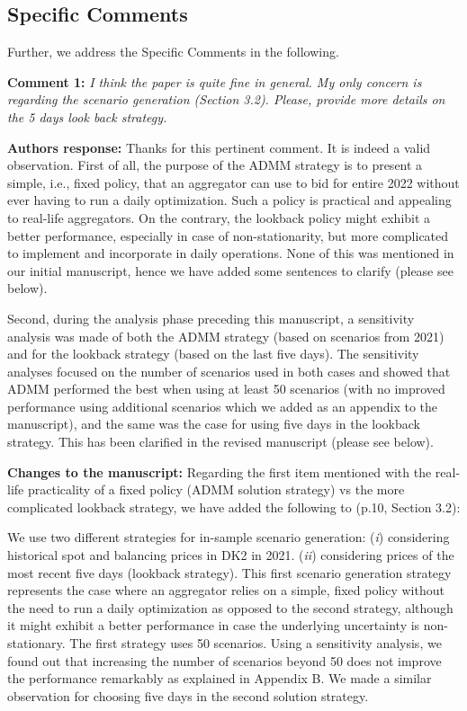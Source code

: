 \documentclass[10pt]{article}
\newcommand{\nt}[1]{\textcolor{newtextcolor}{#1}}
\newcommand{\auth}{\textbf{Authors response: }}
\newcommand{\changes}{\textbf{Changes to the manuscript: }}
\begin{document}
\subsection{Specific Comments}

Further, we address the Specific Comments in the following.

\textbf{Comment 1:} \textit{I think the paper is quite fine in general. My only concern is regarding the scenario generation (Section 3.2). Please, provide more details on the 5 days look back strategy.}

\auth Thanks for this pertinent comment. It is indeed a valid observation. First of all, the purpose of the ADMM strategy is to present a simple, i.e., fixed policy, that an aggregator can use to bid for entire 2022 without ever having to run a daily optimization. Such a policy is practical and appealing to real-life aggregators. On the contrary, the lookback policy might exhibit a better performance, especially in case of non-stationarity, but more complicated to implement and incorporate in daily operations. None of this was mentioned in our initial manuscript, hence we have added some sentences to clarify (please see below).

Second, during the analysis phase preceding this manuscript, a sensitivity analysis was made of both the ADMM strategy (based on scenarios from 2021) and for the lookback strategy (based on the last five days). The sensitivity analyses focused on the number of scenarios used in both cases and showed that ADMM performed the best when using at least 50 scenarios (with no improved performance using additional scenarios which we added as an appendix to the manuscript), and the same was the case for using five days in the lookback strategy. This has been clarified in the revised manuscript (please see below).

\changes Regarding the first item mentioned with the real-life practicality of a fixed policy (ADMM solution strategy) vs the more complicated lookback strategy, we have added the following to (p.10, Section 3.2):

\nt{We use two different strategies for in-sample scenario generation: (\textit{i}) considering historical spot and balancing prices in DK2 in 2021.
(\textit{ii}) considering prices of the most recent five days (lookback strategy). This first scenario generation strategy represents the case where an aggregator relies on a simple, fixed policy without the need to run a daily optimization as opposed to the second  strategy, although it might exhibit a better performance in case the underlying uncertainty is non-stationary. The first  strategy uses 50 scenarios. Using a sensitivity analysis, we found out that increasing the number of scenarios beyond 50 does not improve the performance remarkably as explained in Appendix B. We made a similar observation for choosing five days in the second solution strategy.}
\end{document}
